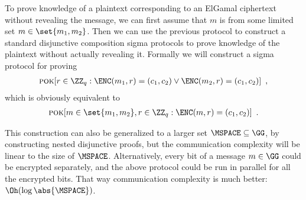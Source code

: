 \documentclass{crypto-exercise}
\begin{document}
\begin{solution}
To prove knowledge of a plaintext corresponding to an ElGamal ciphertext without revealing the message, we can first assume that $m$ is from some limited set $m \in \set{m_1, m_2}$. Then we can use the previous protocol to construct a standard disjunctive composition sigma protocols to prove knowledge of the plaintext without actually revealing it. Formally we will construct a sigma protocol for proving
\begin{align*}
 \POK[r\in\ZZ_q : \ENC(m_1, r) = (c_1, c_2) \vee \ENC(m_2, r) = (c_1, c_2)]\enspace ,\\
\end{align*}
which is obviously equivalent to
\begin{align*}
 \POK[m\in\set{m_1,m_2}, r\in\ZZ_q : \ENC(m, r) = (c_1, c_2)] \enspace.\\
\end{align*}

This construction can also be generalized to a larger set $\MSPACE \subseteq \GG$, by constructing nested disjunctive proofs, but the communication complexity will be linear to the size of $\MSPACE$. Alternatively, every bit of a message $m\in\GG$ could be encrypted separately, and the above protocol could be run in parallel for all the encrypted bits. That way communication complexity is much better: $\Oh(\log \abs{\MSPACE})$.



\end{solution}
\end{document}
